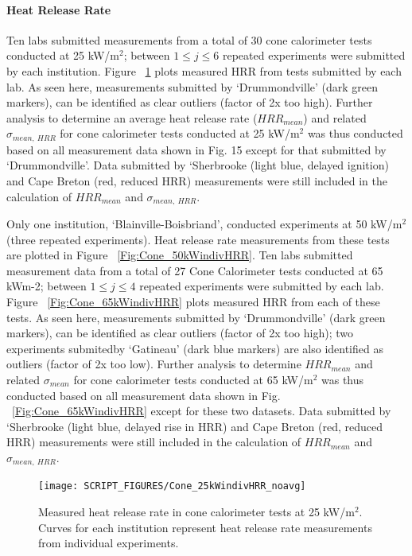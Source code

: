 \documentclass{book}
\begin{document}
\paragraph{Heat Release Rate}

Ten labs submitted measurements from a total of 30 cone calorimeter tests conducted at 25 kW/m$^2$; between $1\le j\le6$ repeated experiments were submitted by each institution. Figure ~\ref{Fig:Cone_25kWindivHRR} plots measured HRR from tests submitted by each lab. As seen here, measurements submitted by ‘Drummondville’ (dark green markers), can be identified as clear outliers (factor of 2x too high). Further analysis to determine an average heat release rate ($HRR_{mean}$) and related $\sigma_{mean,\ HRR}$ for cone calorimeter tests conducted at 25 kW/m$^2$ was thus conducted based on all measurement data shown in Fig. 15 except for that submitted by ‘Drummondville’. Data submitted by ‘Sherbrooke (light blue, delayed ignition) and Cape Breton (red, reduced HRR) measurements were still included in the calculation of  $HRR_{mean}$ and $\sigma_{mean,\ HRR}$.

Only one institution, ‘Blainville-Boisbriand’, conducted experiments at 50 kW/m$^2$ (three repeated experiments). Heat release rate measurements from these tests are plotted in Figure ~\ref{Fig:Cone_50kWindivHRR}.
Ten labs submitted measurement data from a total of 27 Cone Calorimeter tests conducted at 65 kWm-2; between $1\le j\le4$ repeated experiments were submitted by each lab. Figure ~\ref{Fig:Cone_65kWindivHRR} plots measured HRR from each of these tests. As seen here, measurements submitted by ‘Drummondville’ (dark green markers), can be identified as clear outliers (factor of 2x too high); two experiments submitedby ‘Gatineau’ (dark blue markers) are also identified as outliers (factor of 2x too low). Further analysis to determine $HRR_{mean}$ and related $\sigma_{mean}$ for cone calorimeter tests conducted at 65 kW/m$^2$ was thus conducted based on all measurement data shown in Fig. ~\ref{Fig:Cone_65kWindivHRR} except for these two datasets. Data submitted by ‘Sherbrooke (light blue, delayed rise in HRR) and Cape Breton (red, reduced HRR) measurements were still included in the calculation of  $HRR_{mean}$ and $\sigma_{mean,\ HRR}$.

\begin{figure}
  \centering
  \texttt{[image: SCRIPT\_FIGURES/Cone\_25kWindivHRR\_noavg]}
  \caption{Measured heat release rate in cone calorimeter tests at 25 kW/m$^2$. Curves for each institution represent heat release rate measurements from individual experiments.}
  \label{Fig:Cone_25kWindivHRR}
\end{figure}
\end{document}
